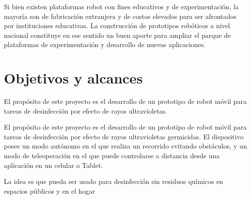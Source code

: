 Si bien existen plataformas robot con fines educativos y de experimentación, la mayoría son de fabricación extranjera y de costos elevados para ser afrontados por instituciones educativas. La construcción de prototipos robóticos a nivel nacional constituye en ese sentido un buen aporte para ampliar el parque de plataformas de experimentación y desarrollo de nuevas aplicaciones.



\section{Objetivos y alcances}

El propósito de este proyecto es el desarrollo de un prototipo de robot móvil para tareas de desinfección por efecto de rayos ultravioletas. 

El propósito de este proyecto es el desarrollo de un prototipo de robot móvil para tareas de desinfección por efecto de rayos ultravioletas germicidas. El dispositivo posee un modo autónomo en el que realiza un recorrido evitando obstáculos, y un modo de teleoperación en el que puede  controlarse a distancia desde una aplicación en un celular o Tablet.  

La idea es que pueda ser usado para desinfección sin residuos químicos en espacios públicos y en el hogar


